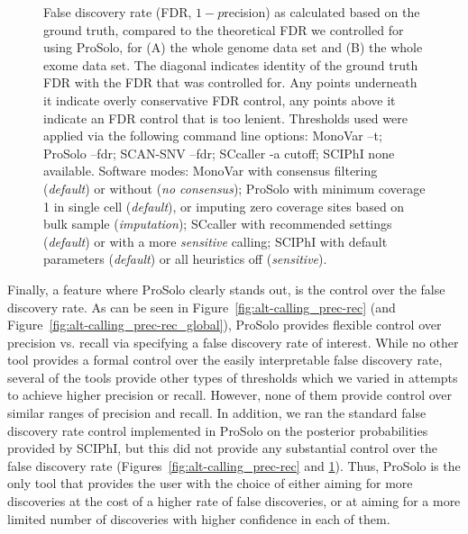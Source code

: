 \documentclass[authoryear,preprint,11pt]{scrartcl}
\begin{document}
\begin{figure}[!tpb]
\begin{minipage}[t]{.99\linewidth}
 \end{minipage}
 \caption{
 False discovery rate (FDR, $1 - p$recision) as calculated based on the ground truth, compared to the theoretical FDR we controlled for using ProSolo, for (A) the whole genome data set and (B) the whole exome data set.
 The diagonal indicates identity of the ground truth FDR with the FDR that was controlled for.
 Any points underneath it indicate overly conservative FDR control, any points above it indicate an FDR control that is too lenient.\newline \footnotesize
  Thresholds used were applied via the following command line options:
  MonoVar {\ttfamily --t};
  ProSolo {\ttfamily --fdr};
  SCAN-SNV {\ttfamily --fdr};
  SCcaller {\ttfamily -a cutoff};
  SCIPhI {\ttfamily none available}.
  Software modes:
  MonoVar with consensus filtering ({\itshape default}) or without ({\itshape no consensus});
  ProSolo with minimum coverage 1 in single cell ({\itshape default}), or imputing zero coverage sites based on bulk sample ({\itshape imputation});
  SCcaller with recommended settings ({\itshape default}) or with a more {\itshape sensitive} calling;
  SCIPhI with default parameters ({\itshape default}) or all heuristics off ({\itshape sensitive}).
 }
 \label{fig:FDR-ground-truth-vs-theoretical}
\end{figure}

Finally, a feature where ProSolo clearly stands out, is the control over the false discovery rate.
As can be seen in Figure~\ref{fig:alt-calling_prec-rec} (and Figure~\ref{fig:alt-calling_prec-rec_global}), ProSolo provides flexible control over precision vs. recall via specifying a false discovery rate of interest.
While no other tool provides a formal control over the easily interpretable false discovery rate, several of the tools provide other types of thresholds which we varied in attempts to achieve higher precision or recall.
However, none of them provide control over similar ranges of precision and recall.
In addition, we ran the standard false discovery rate control implemented in ProSolo on the posterior probabilities provided by SCIPhI, but this did not provide any substantial control over the false discovery rate (Figures~\ref{fig:alt-calling_prec-rec} and \ref{fig:FDR-ground-truth-vs-theoretical}).
Thus, ProSolo is the only tool that provides the user with the choice of either aiming for more discoveries at the cost of a higher rate of false discoveries, or at aiming for a more limited number of discoveries with higher confidence in each of them.
\end{document}
